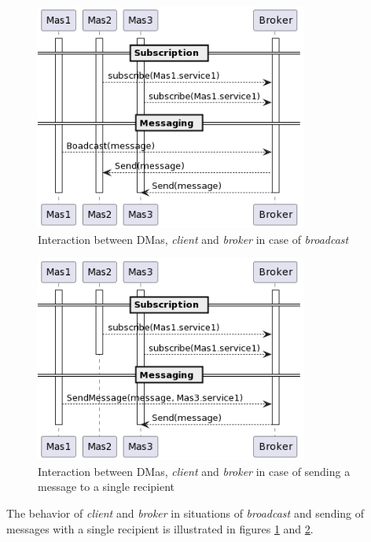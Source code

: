 \begin{figure}[ht!]
    \centering
    \includegraphics[width=0.8\textwidth]{figures/interaction-broadcast.png}
    \caption{Interaction between DMas, \textit{client} and \textit{broker} in case of \textit{broadcast}}
    \label{fig:interaction-broadcast}
\end{figure}

\begin{figure}[ht!]
    \centering
    \includegraphics[width=0.8\textwidth]{figures/interaction-sendmessage.png}
    \caption{Interaction between DMas, \textit{client} and \textit{broker} in case of sending a message to a single recipient}
    \label{fig:interaction-sendmessage}
\end{figure}

The behavior of \textit{client} and \textit{broker} in situations of \textit{broadcast} and sending of messages with a single recipient is illustrated in figures \ref{fig:interaction-broadcast} and \ref{fig:interaction-sendmessage}.

